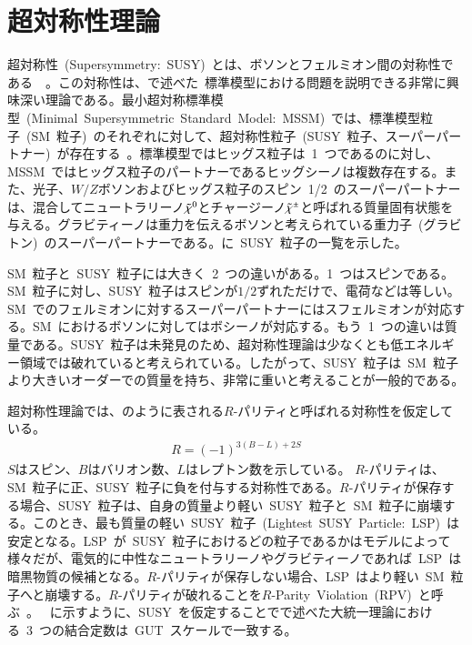 \section{超対称性理論}
超対称性~(Supersymmetry:~SUSY)~とは、ボソンとフェルミオン間の対称性である~\cite{AR:12}~\cite{AR:12a}。この対称性は、で述べた~標準模型における問題を説明できる非常に興味深い理論である。最小超対称標準模型~(Minimal~Supersymmetric~Standard~Model:~MSSM)~では、標準模型粒子~(SM~粒子)~のそれぞれに対して、超対称性粒子~(SUSY~粒子、スーパーパートナー)~が存在する~\cite{AR:12b}。標準模型ではヒッグス粒子は~1~つであるのに対し、MSSM~ではヒッグス粒子のパートナーであるヒッグシーノは複数存在する。また、光子、$W/Z$ボソンおよびヒッグス粒子のスピン~1/2~のスーパーパートナーは、混合してニュートラリーノ$\Tilde{\chi}^0$とチャージーノ$\Tilde{\chi}^{\pm}$と呼ばれる質量固有状態を与える。グラビティーノは重力を伝えるボソンと考えられている重力子~(グラビトン)~のスーパーパートナーである。に~SUSY~粒子の一覧を示した。

SM~粒子と~SUSY~粒子には大きく~2~つの違いがある。1~つはスピンである。SM~粒子に対し、SUSY~粒子はスピンが$1/2$ずれただけで、電荷などは等しい。SM~でのフェルミオンに対するスーパーパートナーにはスフェルミオンが対応する。SM~におけるボソンに対してはボシーノが対応する。もう~1~つの違いは質量である。SUSY~粒子は未発見のため、超対称性理論は少なくとも低エネルギー領域では破れていると考えられている。したがって、SUSY~粒子は~SM~粒子より大きいオーダーでの質量を持ち、非常に重いと考えることが一般的である。

超対称性理論では、のように表される$R$-パリティと呼ばれる対称性を仮定している。
\begin{align}
    R = (-1)^{3(B-L)+2S} \label{eq:Rparity}
\end{align}
$S$はスピン、$B$はバリオン数、$L$はレプトン数を示している。
$R$-パリティは、SM~粒子に正、SUSY~粒子に負を付与する対称性である。$R$-パリティが保存する場合、SUSY~粒子は、自身の質量より軽い~SUSY~粒子と~SM~粒子に崩壊する。このとき、最も質量の軽い~SUSY~粒子~(Lightest~SUSY~Particle:~LSP)~は安定となる。LSP~が~SUSY~粒子におけるどの粒子であるかはモデルによって様々だが、電気的に中性なニュートラリーノやグラビティーノであれば~LSP~は暗黒物質の候補となる。$R$-パリティが保存しない場合、LSP~はより軽い~SM~粒子へと崩壊する。$R$-パリティが破れることを$R$-Parity~Violation~(RPV)~と呼ぶ~\cite{AR:12g}。
~に示すように、SUSY~を仮定することでで述べた大統一理論における~3~つの結合定数は~GUT~スケールで一致する。

